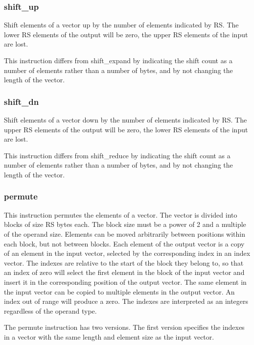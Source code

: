 \documentclass[forwardcom.tex]{subfiles}
\begin{document}
\subsubsection{shift\_up}
Shift elements of a vector up by the number of elements indicated by RS. The lower RS elements of the output will be zero, the upper RS elements of the input are lost.
\vspace{2mm}

This instruction differs from shift\_expand by indicating the shift count as a number of elements rather than a number of bytes, and by not changing the length of the vector.

\subsubsection{shift\_dn}
Shift elements of a vector down by the number of elements indicated by RS. The upper RS elements of the output will be zero, the lower RS elements of the input are lost.
\vspace{2mm}

This instruction differs from shift\_reduce by indicating the shift count as a number of elements rather than a number of bytes, and by not changing the length of the vector.

\subsubsection{permute}
This instruction permutes the elements of a vector. The vector is divided into blocks of size RS bytes each. The block size must be a power of 2 and a multiple of the operand size. Elements can be moved arbitrarily between positions within each block, but not between blocks. Each element of the output vector is a copy of an element in the input vector, selected by the corresponding index in an index vector. The indexes are relative to the start of the block they belong to, so that an index of zero will select the first element in the block of the input vector and insert it in the corresponding position of the output vector. The same element in the input vector can be copied to multiple elements in the output vector. An index out of range will produce a zero. The indexes are interpreted as an integers regardless of the operand type.
\vspace{2mm}

The permute instruction has two versions. The first version specifies the indexes in a vector with the same length and element size as the input vector.
\vspace{2mm}
\end{document}
